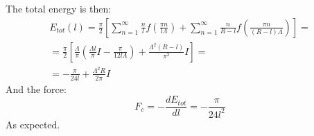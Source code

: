 \documentclass{article}
\begin{document}
The total energy is then:
\begin{equation}
\begin{gathered}
     E_{tot}(l) = \frac{\pi}{2}\left[
        \sum_{n=1}^\infty
        \frac{n}{l}f\left(\frac{\pi n}{l \Lambda}\right) +
        \sum_{n=1}^\infty
        \frac{n}{R - l}f\left(\frac{\pi n}{(R - l) \Lambda}\right)
    \right] = \\ =
    \frac{\pi}{2}\left[
        \frac{\Lambda}{\pi}\left(\frac{\Lambda l}{\pi}I - \frac{\pi}{12l\Lambda}\right) +
        \frac{\Lambda^2(R - l)}{\pi^2}I
    \right] = \\ =
    - \frac{\pi}{24l} + \frac{\Lambda^2 R}{2\pi} I
\end{gathered}
\end{equation}
And the force:
\begin{equation}
    F_c = -\frac{dE_{tot}}{dl} = - \frac{\pi}{24l^2}
\end{equation}
As expected.
\end{document}
